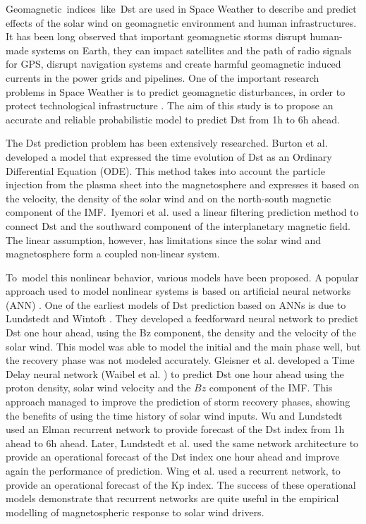 Geomagnetic\ indices\ like\ Dst are used in Space Weather to describe and predict effects of the solar wind on 
geomagnetic environment and human infrastructures. It has been long observed that important geomagnetic storms 
disrupt human-made systems on Earth, they can impact satellites and the path of radio signals for GPS, 
disrupt navigation systems and create harmful geomagnetic induced currents in the power grids and pipelines. 
One of the important research problems in Space Weather is to predict geomagnetic disturbances, in order  
to protect technological infrastructure \cite{Singh2010}. The aim of this study is to propose an  accurate 
and reliable probabilistic model to predict Dst from 1h to 6h ahead. 

The Dst prediction problem has been extensively researched. Burton et al. \cite{JGR:JGR10260} developed a model 
that expressed the time evolution of Dst as an Ordinary Differential Equation (ODE). This method takes into account 
the particle injection from the plasma sheet into the magnetosphere and expresses it based on the velocity, 
the density of the solar wind and on the north-south magnetic component of the IMF.\ Iyemori et al. \cite{Iyemori1979} 
used a linear filtering prediction method to connect Dst and the southward component of the interplanetary 
magnetic field. The linear assumption, however, has limitations since  the solar wind and magnetosphere form a 
coupled non-linear system. 

To\ model this nonlinear behavior, various models have been proposed. A popular  approach used to model 
nonlinear systems is based on artificial neural networks (ANN) \cite{haykin1994neural}. One of the earliest models of 
Dst prediction based on ANNs is due to Lundstedt and Wintoft \cite{lundstedt1994prediction}. They developed a 
feedforward neural network to predict Dst one hour ahead, using the Bz component, the density and the velocity of 
the solar wind. This model was able to model the initial and the main phase well, but the recovery phase was not 
modeled accurately. Gleisner et al. \cite{gleisner1996predicting} developed a Time Delay neural network 
(Waibel et al. \cite{Waibel1989}) to predict Dst one hour ahead using the proton density, solar wind velocity and the  
\( Bz  \) component of the IMF. This approach managed to improve the prediction of storm recovery phases, 
showing the benefits of using the time history of solar wind inputs. Wu and Lundstedt \cite{wu1997geomagnetic} 
used an Elman recurrent network \cite{elman} to provide forecast of the Dst index from 1h ahead to 6h ahead. 
Later, Lundstedt et al. \cite{Lund} used the same network architecture to provide an operational forecast of 
the Dst index one hour ahead and improve again the performance of prediction. Wing et al. \cite{JGRA:JGRA17461} 
used a recurrent network, to provide an operational forecast of the Kp index. The success of these operational 
models demonstrate that recurrent networks are quite useful in the empirical modelling of magnetospheric 
response to solar wind drivers. 


